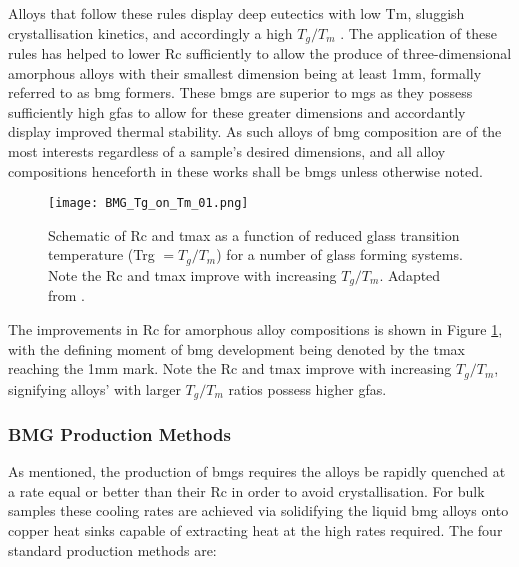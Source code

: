 \documentclass[a4paper,12pt,oneside]{report}%
\begin{document}
Alloys that follow these rules display deep eutectics with low \gls{Tm}, sluggish crystallisation kinetics, and accordingly a high $T_{g}/T_{m}$ \cite{Inoue2000, Schroers2010}. The application of these rules has helped to lower \gls{Rc} sufficiently to allow the produce of three-dimensional amorphous alloys with their smallest dimension being at least 1mm, formally referred to as \gls{bmg} formers. These \glspl{bmg} are superior to \glspl{mg} as they possess sufficiently high \glspl{gfa} to allow for these greater dimensions and accordantly display improved thermal stability. As such alloys of \gls{bmg} composition are of the most interests regardless of a sample's desired dimensions, and all alloy compositions henceforth in these works shall be \glspl{bmg} unless otherwise noted. 

\begin{figure}[htb]
	\centering
	\texttt{[image: BMG\_Tg\_on\_Tm\_01.png]}
	\caption[Schematic of \acrfull{Rc} and \acrfull{tmax} as a function of reduced glass transition temperature (\acrshort{Trg} $= T_{g}/T_{m}$) for a number of glass forming systems. Note the \acrshort{Rc} and \acrshort{tmax} improve with increasing $T_{g}/T_{m}$.]{Schematic of \acrfull{Rc} and \acrfull{tmax} as a function of reduced glass transition temperature (\acrshort{Trg} $= T_{g}/T_{m}$) for a number of glass forming systems. Note the \acrshort{Rc} and \acrshort{tmax} improve with increasing $T_{g}/T_{m}$. Adapted from \cite{Trexler2010}.}
	\label{fig:BMGRc}
\end{figure}

The improvements in \gls{Rc} for amorphous alloy compositions is shown in Figure \ref{fig:BMGRc}, with the defining moment of \gls{bmg} development being denoted by the \gls{tmax} reaching the 1mm mark. Note the \gls{Rc} and \gls{tmax} improve with increasing $T_{g}/T_{m}$, signifying alloys' with larger $T_{g}/T_{m}$ ratios possess higher \glspl{gfa}. 

\subsubsection{BMG Production Methods}
As mentioned, the production of \glspl{bmg} requires the alloys be rapidly quenched at a rate equal or better than their \gls{Rc} in order to avoid crystallisation. For bulk samples these cooling rates are achieved via solidifying the liquid \gls{bmg} alloys onto copper heat sinks capable of extracting heat at the high rates required. The four standard production methods are: 
\end{document}
